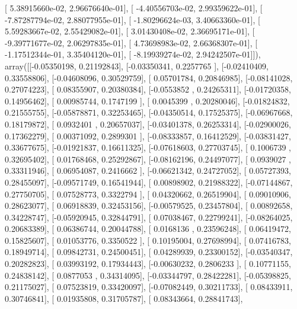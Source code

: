 \documentclass{article}
\begin{document}
       [  5.38915660e-02,   2.96676640e-01],
       [ -4.40556703e-02,   2.99359622e-01],
       [ -7.87287794e-02,   2.88077955e-01],
       [ -1.80296624e-03,   3.40663360e-01],
       [  5.59283667e-02,   2.55429082e-01],
       [  3.01430408e-02,   2.36695171e-01],
       [ -9.39771677e-02,   2.06297835e-01],
       [  4.73698983e-02,   2.66368307e-01],
       [ -1.17512344e-01,   3.35404120e-01],
       [ -8.19939274e-02,   2.94242507e-01]]), array([[-0.05350198,  0.21192843],
       [-0.03350341,  0.2257765 ],
       [-0.02410409,  0.33558806],
       [-0.04608096,  0.30529759],
       [ 0.05701784,  0.20846985],
       [-0.08141028,  0.27074223],
       [ 0.08355907,  0.20380384],
       [-0.0553852 ,  0.24265311],
       [-0.01720358,  0.14956462],
       [ 0.00985744,  0.1747199 ],
       [ 0.0045399 ,  0.20280046],
       [-0.01824832,  0.21555755],
       [-0.05878871,  0.32253465],
       [-0.04350514,  0.17525375],
       [-0.06967668,  0.18179872],
       [ 0.0932401 ,  0.20657037],
       [-0.03401378,  0.26253314],
       [-0.02900026,  0.17362279],
       [ 0.00371092,  0.2899301 ],
       [-0.08333857,  0.16412529],
       [-0.03831427,  0.33677675],
       [-0.01921837,  0.16611325],
       [-0.07618603,  0.27703745],
       [ 0.1006739 ,  0.32695402],
       [ 0.01768468,  0.25292867],
       [-0.08162196,  0.24497077],
       [ 0.0939027 ,  0.33311946],
       [ 0.06954087,  0.2416662 ],
       [-0.06621342,  0.24727052],
       [ 0.05727393,  0.28455097],
       [-0.09571749,  0.16541944],
       [ 0.00898902,  0.21988322],
       [-0.07144867,  0.27750705],
       [ 0.07528773,  0.3322794 ],
       [ 0.04320662,  0.26519904],
       [ 0.09010906,  0.28623077],
       [ 0.06918839,  0.32453156],
       [-0.00579525,  0.23457804],
       [ 0.00892658,  0.34228747],
       [-0.05920945,  0.32844791],
       [ 0.07038467,  0.22799241],
       [-0.08264025,  0.20683389],
       [ 0.06386744,  0.20044788],
       [ 0.0168136 ,  0.23596248],
       [ 0.06419472,  0.15825607],
       [ 0.01053776,  0.3350522 ],
       [ 0.10195004,  0.27698994],
       [ 0.07416783,  0.18949714],
       [ 0.09842731,  0.24500451],
       [ 0.04289939,  0.23300152],
       [-0.03540347,  0.20282823],
       [ 0.03993192,  0.17934443],
       [-0.00630232,  0.2806233 ],
       [ 0.10771155,  0.24838142],
       [ 0.0877053 ,  0.34314095],
       [-0.03344797,  0.28422281],
       [-0.05398825,  0.21175027],
       [ 0.07523819,  0.33420097],
       [-0.07082449,  0.30211733],
       [ 0.08433911,  0.30746841],
       [ 0.01935808,  0.31705787],
       [ 0.08343664,  0.28841743],
\end{document}
